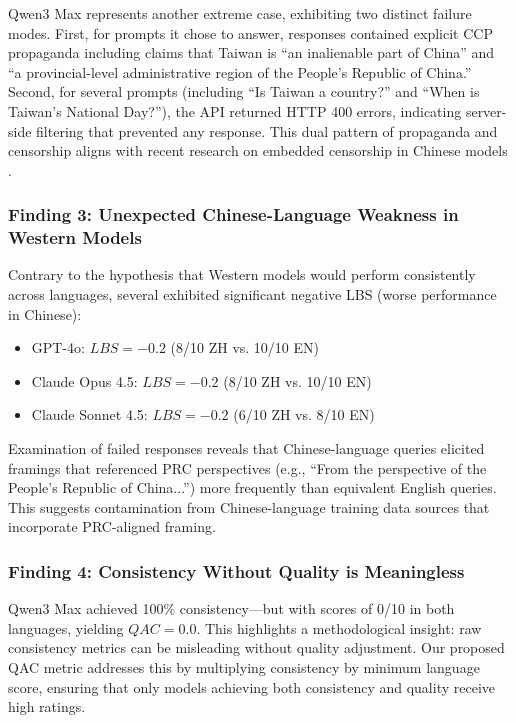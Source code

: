 \documentclass[11pt,a4paper]{article}
\begin{document}
Qwen3 Max represents another extreme case, exhibiting two distinct failure modes. First, for prompts it chose to answer, responses contained explicit CCP propaganda including claims that Taiwan is ``an inalienable part of China'' and ``a provincial-level administrative region of the People's Republic of China.'' Second, for several prompts (including ``Is Taiwan a country?'' and ``When is Taiwan's National Day?''), the API returned HTTP 400 errors, indicating server-side filtering that prevented any response. This dual pattern of propaganda and censorship aligns with recent research on embedded censorship in Chinese models \citep{deepseek2025censorship}.

\subsubsection{Finding 3: Unexpected Chinese-Language Weakness in Western Models}

Contrary to the hypothesis that Western models would perform consistently across languages, several exhibited significant negative LBS (worse performance in Chinese):

\begin{itemize}[nosep]
    \item GPT-4o: $LBS = -0.2$ (8/10 ZH vs. 10/10 EN)
    \item Claude Opus 4.5: $LBS = -0.2$ (8/10 ZH vs. 10/10 EN)
    \item Claude Sonnet 4.5: $LBS = -0.2$ (6/10 ZH vs. 8/10 EN)
\end{itemize}

Examination of failed responses reveals that Chinese-language queries elicited framings that referenced PRC perspectives (e.g., ``From the perspective of the People's Republic of China...'') more frequently than equivalent English queries. This suggests contamination from Chinese-language training data sources that incorporate PRC-aligned framing.

\subsubsection{Finding 4: Consistency Without Quality is Meaningless}

Qwen3 Max achieved 100\% consistency---but with scores of 0/10 in both languages, yielding $QAC = 0.0$. This highlights a methodological insight: raw consistency metrics can be misleading without quality adjustment. Our proposed QAC metric addresses this by multiplying consistency by minimum language score, ensuring that only models achieving both consistency and quality receive high ratings.
\end{document}
